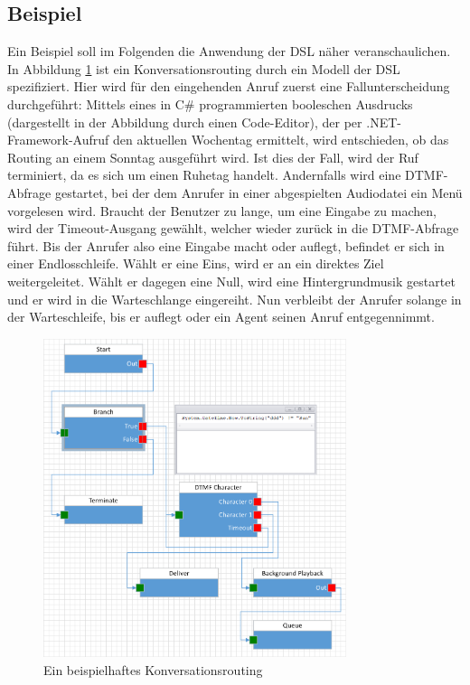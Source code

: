 \subsection{Beispiel}
Ein Beispiel soll im Folgenden die Anwendung der DSL näher veranschaulichen. In Abbildung \ref{fig:ExampleRouting} ist ein Konversationsrouting durch ein Modell der DSL spezifiziert. Hier wird für den eingehenden Anruf zuerst eine Fallunterscheidung durchgeführt: Mittels eines in C\# programmierten booleschen Ausdrucks (dargestellt in der Abbildung durch einen Code-Editor), der per .NET-Framework-Aufruf den aktuellen Wochentag ermittelt, wird entschieden, ob das Routing an einem Sonntag ausgeführt wird. Ist dies der Fall, wird der Ruf terminiert, da es sich um einen Ruhetag handelt. Andernfalls wird eine DTMF-Abfrage gestartet, bei der dem Anrufer in einer abgespielten Audiodatei ein Menü vorgelesen wird. Braucht der Benutzer zu lange, um eine Eingabe zu machen, wird der Timeout-Ausgang gewählt, welcher wieder zurück in die DTMF-Abfrage führt. Bis der Anrufer also eine Eingabe macht oder auflegt, befindet er sich in einer Endlosschleife. Wählt er eine Eins, wird er an ein direktes Ziel weitergeleitet. Wählt er dagegen eine Null, wird eine Hintergrundmusik gestartet und er wird in die Warteschlange eingereiht. Nun verbleibt der Anrufer solange in der Warteschleife, bis er auflegt oder ein Agent seinen Anruf entgegennimmt.  

\begin{figure} %
	\centering
		\includegraphics[width=0.79\textwidth]{img/ExampleRoutingRaw.png}
	\caption[Beispiel für ein Konversationsrouting]{Ein beispielhaftes Konversationsrouting}
	\label{fig:ExampleRouting}
\end{figure}

